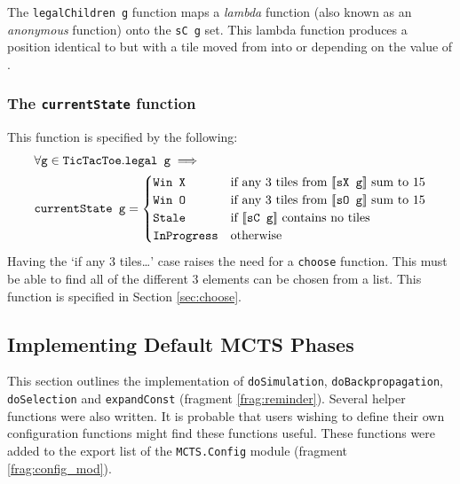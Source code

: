 The \verb|legalChildren g| function maps a \textit{lambda}  function (also known as an \textit{anonymous} function) onto the \texttt{sC g} set. This lambda function produces a position identical to  but with a tile moved from  into  or  depending on the value of .


\subsubsection{The \texttt{currentState} function}
This function is specified by the following:
\begin{equation}
\begin{split}
&\forall\texttt{g}\in\texttt{TicTacToe}.\texttt{legal g}\implies\\
&\texttt{currentState g} =
\begin{cases}
\texttt{Win X} & \text{if any 3 tiles from \mbox{$[\![ \texttt{sX g} ]\!]$} sum to 15}\\
\texttt{Win O} & \text{if any 3 tiles from \mbox{$[\![ \texttt{sO g} ]\!]$} sum to 15}\\
\texttt{Stale} & \text{if \mbox{$[\![ \texttt{sC g} ]\!]$} contains no tiles}\\
\texttt{InProgress} & \text{otherwise}\\
\end{cases}
\end{split}
\nonumber
\end{equation}
Having the `if any 3 tiles\ldots' case raises the need for a \texttt{choose} function. This must be able to find all of the different 3 elements can be chosen from a list. This function is specified in Section \ref{sec:choose}.


\subsection{Implementing Default {MCTS} Phases}
This section outlines the implementation of \texttt{doSimulation}, \texttt{doBackpropagation}, \texttt{doSelection} and \texttt{expandConst} (fragment \ref{frag:reminder}).
Several helper functions were also written. It is probable that users wishing to define their own configuration functions might find these functions useful. These functions were added to the export list of the \texttt{MCTS.Config} module (fragment \ref{frag:config_mod}). 

